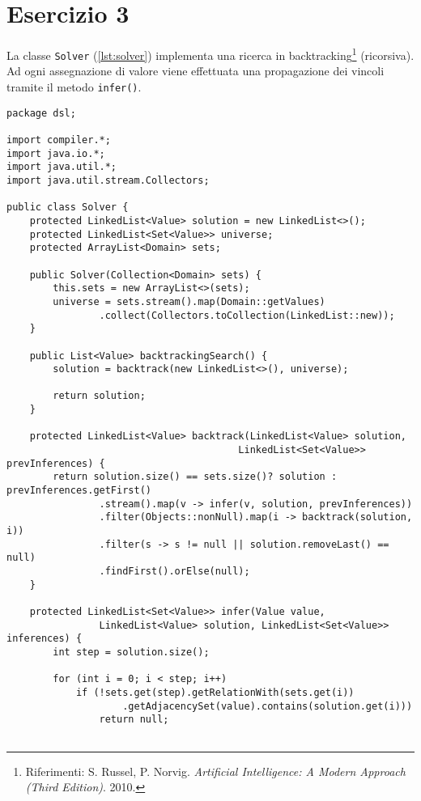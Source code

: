 \section*{Esercizio 3}

La classe {\tt Solver} (\autoref{lst:solver}) implementa una ricerca in
backtracking\footnote{Riferimenti: S. Russel, P. Norvig. \emph{Artificial
Intelligence: A Modern Approach (Third Edition)}. 2010.} (ricorsiva). Ad ogni
assegnazione di valore viene effettuata una propagazione dei vincoli tramite il
metodo {\tt infer()}.

% 
\bgroup
{}
\begin{lstlisting}[caption=Solver.java, label=lst:solver]
package dsl;

import compiler.*;
import java.io.*;
import java.util.*;
import java.util.stream.Collectors;

public class Solver {
    protected LinkedList<Value> solution = new LinkedList<>();
    protected LinkedList<Set<Value>> universe;
    protected ArrayList<Domain> sets;

    public Solver(Collection<Domain> sets) {
        this.sets = new ArrayList<>(sets);
        universe = sets.stream().map(Domain::getValues)
                .collect(Collectors.toCollection(LinkedList::new));
    }

    public List<Value> backtrackingSearch() {
        solution = backtrack(new LinkedList<>(), universe);

        return solution;
    }

    protected LinkedList<Value> backtrack(LinkedList<Value> solution,
                                        LinkedList<Set<Value>> prevInferences) {
        return solution.size() == sets.size()? solution : prevInferences.getFirst()
                .stream().map(v -> infer(v, solution, prevInferences))
                .filter(Objects::nonNull).map(i -> backtrack(solution, i))
                .filter(s -> s != null || solution.removeLast() == null)
                .findFirst().orElse(null);
    }

    protected LinkedList<Set<Value>> infer(Value value,
                LinkedList<Value> solution, LinkedList<Set<Value>> inferences) {
        int step = solution.size();

        for (int i = 0; i < step; i++)
            if (!sets.get(step).getRelationWith(sets.get(i))
                    .getAdjacencySet(value).contains(solution.get(i)))
                return null;


\end{lstlisting}
